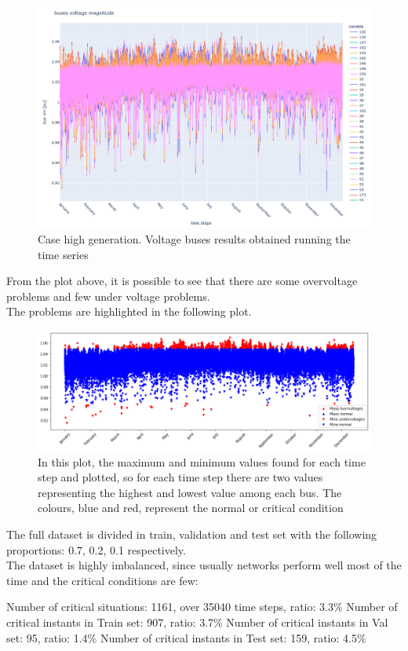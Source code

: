 \begin{figure}[H]
\centering
    \includegraphics[width=.7\linewidth]{images/MVOberr/High gen.png}
\caption{Case high generation. Voltage buses results obtained running the time series}
\label{fig:gym_anm_net}
\end{figure}

From the plot above, it is possible to see that there are some overvoltage problems and few under voltage problems. \\
The problems are highlighted in the following plot.

\begin{figure}[H]
\centering
    \includegraphics[width=.8\linewidth]{images/MVOberr/High gen problems.png}
\caption{In this plot, the maximum and minimum values found for each time step and plotted, so for each time step there are two values representing the highest and lowest value among each bus. The colours, blue and red, represent the normal or critical condition}

 \end{figure}

The full dataset is divided in train, validation and test set with the following proportions: 0.7, 0.2, 0.1 respectively. \\
The dataset is highly imbalanced, since usually networks perform well most of the time and the critical conditions are few:


\begin{algorithm}[h]
    \State Number of critical situations: 1161, over 35040 time steps, ratio: 3.3\%
    \State
    \State Number of critical instants in Train set: 907, ratio: 3.7\%
    \State Number of critical instants in Val set: 95, ratio: 1.4\%
    \State Number of critical instants in Test set: 159, ratio: 4.5\%
\end{algorithm}


